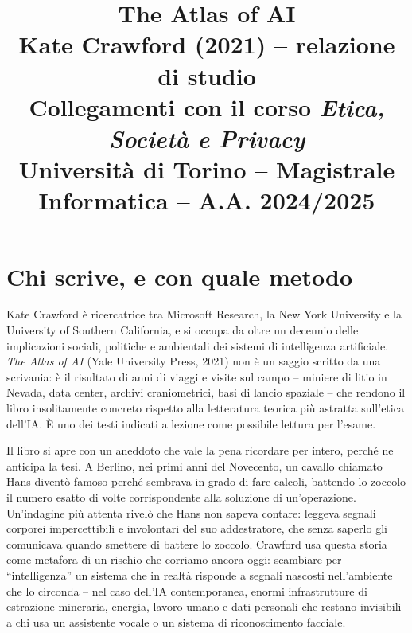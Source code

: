 \documentclass[a4paper,11pt]{article}
\title{\textbf{The Atlas of AI}\\[0.3em]
\large Kate Crawford (2021) -- relazione di studio\\[0.3em]
\normalsize Collegamenti con il corso \emph{Etica, Società e Privacy}\\
Università di Torino -- Magistrale Informatica -- A.A. 2024/2025}
\author{}
\date{}
\begin{document}
\maketitle
\tableofcontents
\newpage

\section{Chi scrive, e con quale metodo}

Kate Crawford è ricercatrice tra Microsoft Research, la New York University e la University of Southern California, e si occupa da oltre un decennio delle implicazioni sociali, politiche e ambientali dei sistemi di intelligenza artificiale. \emph{The Atlas of AI} (Yale University Press, 2021) non è un saggio scritto da una scrivania: è il risultato di anni di viaggi e visite sul campo -- miniere di litio in Nevada, data center, archivi craniometrici, basi di lancio spaziale -- che rendono il libro insolitamente concreto rispetto alla letteratura teorica più astratta sull'etica dell'IA. È uno dei testi indicati a lezione come possibile lettura per l'esame.

Il libro si apre con un aneddoto che vale la pena ricordare per intero, perché ne anticipa la tesi. A Berlino, nei primi anni del Novecento, un cavallo chiamato Hans diventò famoso perché sembrava in grado di fare calcoli, battendo lo zoccolo il numero esatto di volte corrispondente alla soluzione di un'operazione. Un'indagine più attenta rivelò che Hans non sapeva contare: leggeva segnali corporei impercettibili e involontari del suo addestratore, che senza saperlo gli comunicava quando smettere di battere lo zoccolo. Crawford usa questa storia come metafora di un rischio che corriamo ancora oggi: scambiare per ``intelligenza'' un sistema che in realtà risponde a segnali nascosti nell'ambiente che lo circonda -- nel caso dell'IA contemporanea, enormi infrastrutture di estrazione mineraria, energia, lavoro umano e dati personali che restano invisibili a chi usa un assistente vocale o un sistema di riconoscimento facciale.
\end{document}
